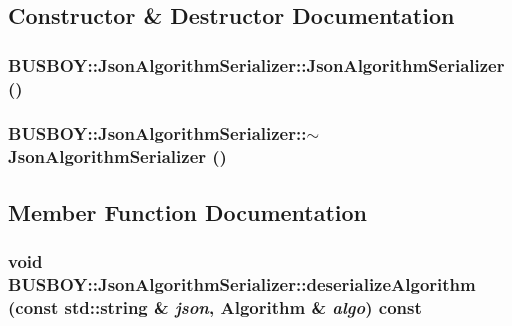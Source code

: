 \subsection{Constructor \& Destructor Documentation}
\hypertarget{classBUSBOY_1_1JsonAlgorithmSerializer_af0defa658500d35fe08826ddc109da74}{
\subsubsection[{JsonAlgorithmSerializer}]{\setlength{\rightskip}{0pt plus 5cm}BUSBOY::JsonAlgorithmSerializer::JsonAlgorithmSerializer ()}}
\label{classBUSBOY_1_1JsonAlgorithmSerializer_af0defa658500d35fe08826ddc109da74}
\hypertarget{classBUSBOY_1_1JsonAlgorithmSerializer_a334bc3b875941d24d4018c4bc5c8adc4}{
\subsubsection[{$\sim$JsonAlgorithmSerializer}]{\setlength{\rightskip}{0pt plus 5cm}BUSBOY::JsonAlgorithmSerializer::$\sim$JsonAlgorithmSerializer ()}}
\label{classBUSBOY_1_1JsonAlgorithmSerializer_a334bc3b875941d24d4018c4bc5c8adc4}


\subsection{Member Function Documentation}
\hypertarget{classBUSBOY_1_1JsonAlgorithmSerializer_a569938b93fb3a067168f1ca098aa8ea0}{
\subsubsection[{deserializeAlgorithm}]{\setlength{\rightskip}{0pt plus 5cm}void BUSBOY::JsonAlgorithmSerializer::deserializeAlgorithm (const std::string \& {\em json}, \/  {\bf Algorithm} \& {\em algo}) const}}
\label{classBUSBOY_1_1JsonAlgorithmSerializer_a569938b93fb3a067168f1ca098aa8ea0}


